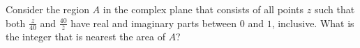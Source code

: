 Consider the region $A$ in the complex plane that consists of all points $z$ such that both $\frac{z}{40}$ and $\frac{40}{\overline{z}}$ have real and imaginary parts between $0$ and $1$, inclusive. What is the integer that is nearest the area of $A$?